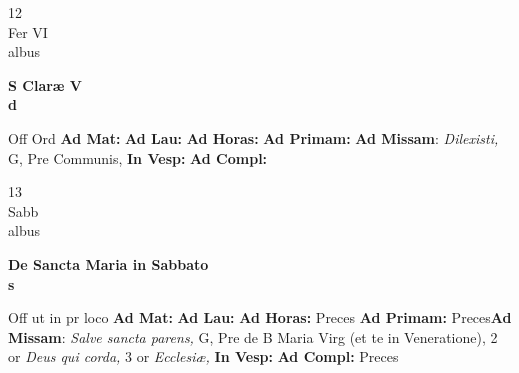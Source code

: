 \documentclass[10pt, openany]{book}
\begin{document}
    \begin{center}
        \begin{minipage}{3.5in}
            \vspace{2em}
            \begin{minipage}{0.5in}
                {\Huge 12} \\
                {\normalsize Fer VI} \\
                {\normalsize albus}
            \end{minipage}
            \begin{minipage}{3.0in}
                \textbf{ \large S Claræ V \\
                \textnormal{\normalsize d}} \\ 
            \end{minipage}
            \begin{justify}Off Ord
                \textbf{Ad Mat: }
                \textbf{Ad Lau: }
                \textbf{Ad Horas: }
                \textbf{Ad Primam: }\textbf{Ad Missam}: \textit{Dilexisti,} G, Pre Communis,  
                \textbf{In Vesp: }
                \textbf{Ad Compl: }
            \end{justify}
        \end{minipage}
    \end{center}

    \begin{center}
        \begin{minipage}{3.5in}
            \vspace{2em}
            \begin{minipage}{0.5in}
                {\Huge 13} \\
                {\normalsize Sabb} \\
                {\normalsize albus}
            \end{minipage}
            \begin{minipage}{3.0in}
                \textbf{ \large De Sancta Maria in Sabbato \\
                \textnormal{\normalsize s}} \\ 
            \end{minipage}
            \begin{justify}Off ut in pr loco
                \textbf{Ad Mat: }
                \textbf{Ad Lau: }
                \textbf{Ad Horas: }Preces
                \textbf{Ad Primam: }Preces\textbf{Ad Missam}: \textit{Salve sancta parens,} G, Pre de B Maria Virg (et te in Veneratione), 2 or \textit{Deus qui corda,} 3 or \textit{Ecclesiæ,}  
                \textbf{In Vesp: }
                \textbf{Ad Compl: }Preces
            \end{justify}
        \end{minipage}
    \end{center}
\end{document}
